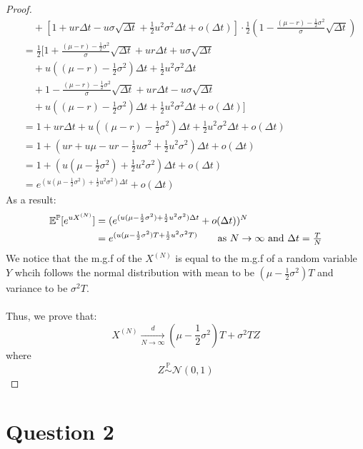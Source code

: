\documentclass[12pt, letterpaper]{article}
\begin{document}
\begin{proof}
\begin{align*}
    & \quad + [1+u r\Delta t-u \sigma \sqrt{\Delta t} +\frac{1}{2}u^2\sigma^2\Delta t + o(\Delta t)] \cdot \frac{1}{2} (1 - \frac{(\mu -r) - \frac{1}{2}\sigma^2}{\sigma} \sqrt{\Delta t}) \\
    &= \frac{1}{2}[ 1 + \frac{(\mu - r) - \frac{1}{2}\sigma^2}{\sigma}\sqrt{\Delta t} + u r \Delta t + u \sigma \sqrt{\Delta t} \\
    & \quad + u((\mu -r) - \frac{1}{2}\sigma^2)\Delta t + \frac{1}{2}u^2 \sigma^2 \Delta t \\
    & \quad + 1 - \frac{(\mu - r) - \frac{1}{2}\sigma^2}{\sigma}\sqrt{\Delta t} + ur \Delta t - u\sigma \sqrt{\Delta t} \\
    & \quad + u((\mu -r) - \frac{1}{2}\sigma^2)\Delta t + \frac{1}{2}u^2 \sigma^2 \Delta t + o(\Delta t)] \\
    &= 1 + ur \Delta t + u((\mu - r) - \frac{1}{2}\sigma^2)\Delta t + \frac{1}{2}u^2 \sigma^2 \Delta t + o(\Delta t) \\
    &= 1 + (ur + u\mu - ur -\frac{1}{2}u \sigma^2 + \frac{1}{2}u^2 \sigma^2)\Delta t + o(\Delta t) \\
    &= 1 + (u (\mu - \frac{1}{2}\sigma^2) + \frac{1}{2}u^2 \sigma^2)\Delta t + o(\Delta t)\\
    &= e^{(u (\mu - \frac{1}{2}\sigma^2) + \frac{1}{2}u^2 \sigma^2)\Delta t} + o(\Delta t)
\end{align*} 
As a result:
\begin{align*}
  \mathbb{E}^\mathbb{P}[e^{u X^{(N)}}] & = (e^{(u (\mu - \frac{1}{2}\sigma^2) + \frac{1}{2}u^2 \sigma^2)\Delta t} + o(\Delta t))^N\\
    &=  e^{(u(\mu - \frac{1}{2}\sigma^2)T + \frac{1}{2}u^2 \sigma^2T)} \tag*{as $N \rightarrow \infty$ and $\Delta t = \frac{T}{N}$}
\end{align*}
We notice that the m.g.f of the $X^{(N)}$ is equal to the m.g.f of a random variable $Y$ whcih follows the normal distribution with mean to be $(\mu - \frac{1}{2}\sigma^2)T$ and
variance to be $\sigma^2 T$.
\\ \\
Thus, we prove that:
\[X^{(N)} \xrightarrow[N \rightarrow \infty]{d} (\mu - \frac{1}{2}\sigma^2)T + \sigma^2 TZ\]
where 
\[Z \stackrel{\mathbb{P}}{\sim} \mathcal{N}(0, 1)\] 
\end{proof}


\part*{Question 2}
\end{document}
